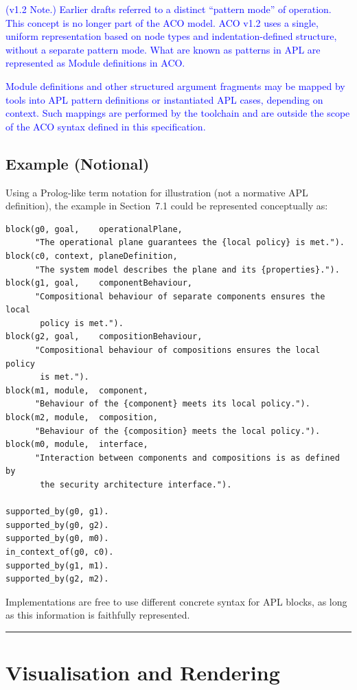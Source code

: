 \documentclass[11pt]{article}
\begin{document}
\textcolor{blue}{(v1.2 Note.)
Earlier drafts referred to a distinct ``pattern mode'' of operation. This concept is
no longer part of the ACO model. ACO v1.2 uses a single, uniform representation based
on node types and indentation-defined structure, without a separate pattern mode. What are known as patterns in APL are represented as Module definitions in ACO.}

\textcolor{blue}{Module definitions and other structured argument fragments
may be mapped by tools into APL pattern definitions or instantiated APL cases, depending
on context. Such mappings are performed by the toolchain and are outside the scope of
the ACO syntax defined in this specification.}

\subsection{Example (Notional)}

Using a Prolog-like term notation for illustration (not a normative APL definition), the example in Section~7.1 could be represented conceptually as:

\begin{verbatim}
block(g0, goal,    operationalPlane,
      "The operational plane guarantees the {local policy} is met.").
block(c0, context, planeDefinition,
      "The system model describes the plane and its {properties}.").
block(g1, goal,    componentBehaviour,
      "Compositional behaviour of separate components ensures the local
       policy is met.").
block(g2, goal,    compositionBehaviour,
      "Compositional behaviour of compositions ensures the local policy
       is met.").
block(m1, module,  component,
      "Behaviour of the {component} meets its local policy.").
block(m2, module,  composition,
      "Behaviour of the {composition} meets the local policy.").
block(m0, module,  interface,
      "Interaction between components and compositions is as defined by
       the security architecture interface.").

supported_by(g0, g1).
supported_by(g0, g2).
supported_by(g0, m0).
in_context_of(g0, c0).
supported_by(g1, m1).
supported_by(g2, m2).
\end{verbatim}

Implementations are free to use different concrete syntax for APL blocks, as long as this information is faithfully represented.

\bigskip
\hrule
\bigskip

\section{Visualisation and Rendering}
\end{document}
